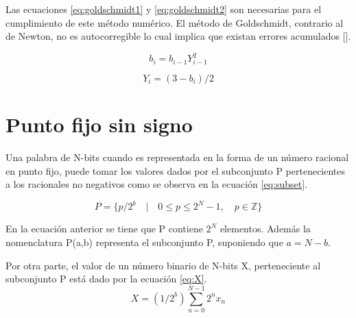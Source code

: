 Las ecuaciones \eqref{eq:goldschmidt1} y \eqref{eq:goldschmidt2} son necesarias para el cumplimiento de este método numérico. El método de Goldschmidt, contrario al de Newton, no es autocorregible lo cual implica que existan errores acumulados [\cite{Markstein2004}].

\begin{equation}
\label{eq:goldschmidt1}
  b_{i}=b_{i-1}Y_{i-1}^{2}
\end{equation}

\begin{equation}
\label{eq:goldschmidt2}
  Y_{i}=(3-b_{i})/2
\end{equation}
  




\section{Punto fijo sin signo}

Una palabra de N-bits cuando es representada en la forma de un número racional en punto fijo, puede tomar los valores dados por el subconjunto P pertenecientes a los racionales no negativos como se observa en la ecuación \eqref{eq:subset}.

\begin{equation}
\label{eq:subset}
	P = \{p/2^{b}\quad |\quad 0 \leq p \leq 2^{N}-1, \quad p \in \mathbb{Z}\}
\end{equation}

En la ecuación anterior se tiene que P contiene $2^{N}$ elementos. Además la nomenclatura P(a,b) representa el subconjunto P, suponiendo que $a=N-b$.

Por otra parte, el valor de un número binario de N-bits X, perteneciente al subconjunto P está dado por la ecuación \eqref{eq:X}.
\begin{equation}
\label{eq:X}
   X = (1/2^{b}){\sum^{N-1}_{n=0}} 2^{n} x_{n}
\end{equation}

